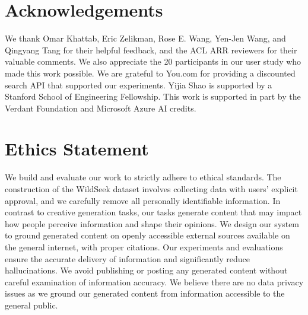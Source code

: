 \documentclass[11pt]{article}
\begin{document}



\section*{Acknowledgements}
We thank Omar Khattab, Eric Zelikman, Rose E. Wang, Yen-Jen Wang, and Qingyang Tang for their helpful feedback, and the ACL ARR reviewers for their valuable comments. We also appreciate the 20 participants in our user study who made this work possible. We are grateful to You.com for providing a discounted search API that supported our experiments. Yijia Shao is supported by a Stanford School of Engineering Fellowship. This work is supported in part by the Verdant Foundation and Microsoft Azure AI credits. 

\section*{Ethics Statement}


We build and evaluate our work to strictly adhere to ethical standards. The construction of the WildSeek dataset involves collecting data with users’ explicit approval, and we carefully remove all personally identifiable information. In contrast to creative generation tasks, our tasks generate content that may impact how people perceive information and shape their opinions. We design our system to ground generated content on openly accessible external sources available on the general internet, with proper citations. Our experiments and evaluations ensure the accurate delivery of information and significantly reduce hallucinations. We avoid publishing or posting any generated content without careful examination of information accuracy. We believe there are no data privacy issues as we ground our generated content from information accessible to the general public.
\end{document}
